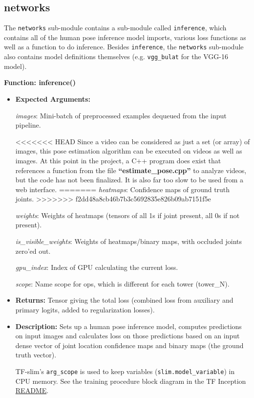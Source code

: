 \documentclass{scrreprt}
\begin{document}
\subsection{networks}

The \verb|networks| sub-module contains a sub-module called \verb|inference|,
which contains all of the human pose inference model imports, various loss
functions as well as a function to do inference. Besides \verb|inference|, the
\verb|networks| sub-module also contains model definitions themselves (e.g.
\verb|vgg_bulat| for the VGG-16 model).

\textbf{Function: inference()}

\begin{itemize}
        \item \textbf{Expected Arguments:}

        \textit{images}: Mini-batch of preprocessed examples dequeued from the
                input pipeline.

<<<<<<< HEAD
Since a video can be considered as just a set (or array) of images, this pose
estimation algorithm can be executed on videos as well as images. At this point
in the project, a C++ program does exist that references a function from the
file \textbf{``estimate\_pose.cpp''} to analyze videos, but the code has not
been finalized. It is also far too slow to be used from a web interface.
=======
        \textit{heatmaps}: Confidence maps of ground truth joints.
>>>>>>> f2dd48a8cb46b7b3c5692835e826b09ab7151f5e

        \textit{weights}: Weights of heatmaps (tensors of all 1s if joint
                present, all 0s if not present).

        \textit{is\_visible\_weights}: Weights of heatmaps/binary maps, with
                occluded joints zero'ed out.

        \textit{gpu\_index}: Index of GPU calculating the current loss.

        \textit{scope}: Name scope for ops, which is different for each tower
                (tower\_N).

        \item \textbf{Returns:} Tensor giving the total loss (combined loss
                from auxiliary and primary logits, added to regularization
                losses).

        \item \textbf{Description:} Sets up a human pose inference model,
                computes predictions on input images and calculates loss on
                those predictions based on an input dense vector of joint
                location confidence maps and binary maps (the ground truth
                vector).

                TF-slim's \verb|arg_scope| is used to keep variables
                (\verb|slim.model_variable|) in CPU memory. See the training
                procedure block diagram in the TF Inception
                \href{https://github.com/tensorflow/models/tree/master/inception}{README}.
\end{itemize}
\end{document}
